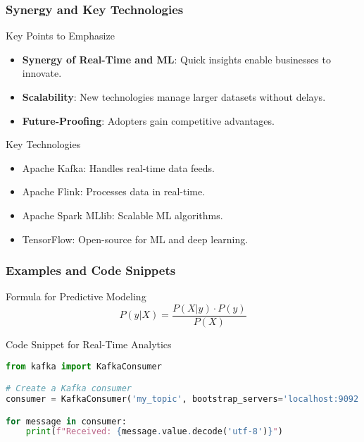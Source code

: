 \documentclass[aspectratio=169]{beamer}
\begin{document}
\begin{frame}[fragile]
    \frametitle{Synergy and Key Technologies}
    \begin{block}{Key Points to Emphasize}
        \begin{itemize}
            \item \textbf{Synergy of Real-Time and ML}: Quick insights enable businesses to innovate.
            \item \textbf{Scalability}: New technologies manage larger datasets without delays.
            \item \textbf{Future-Proofing}: Adopters gain competitive advantages.
        \end{itemize}
    \end{block}
    
    \begin{block}{Key Technologies}
        \begin{itemize}
            \item Apache Kafka: Handles real-time data feeds.
            \item Apache Flink: Processes data in real-time.
            \item Apache Spark MLlib: Scalable ML algorithms.
            \item TensorFlow: Open-source for ML and deep learning.
        \end{itemize}
    \end{block}
\end{frame}

\begin{frame}[fragile]
    \frametitle{Examples and Code Snippets}
    \begin{block}{Formula for Predictive Modeling}
        \begin{equation}
        P(y|X) = \frac{P(X|y) \cdot P(y)}{P(X)}
        \end{equation}
    \end{block}
    
    \begin{block}{Code Snippet for Real-Time Analytics}
    \begin{lstlisting}[language=Python]
from kafka import KafkaConsumer

# Create a Kafka consumer
consumer = KafkaConsumer('my_topic', bootstrap_servers='localhost:9092')

for message in consumer:
    print(f"Received: {message.value.decode('utf-8')}")
    \end{lstlisting}
    \end{block}
\end{frame}
\end{document}

